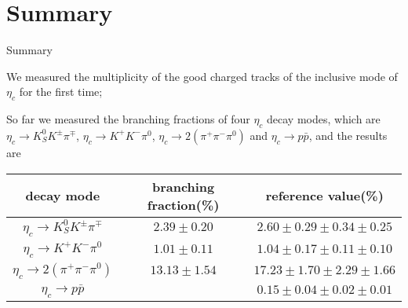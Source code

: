 \documentclass{beamer}
\begin{document}
\section{Summary}
\begin{frame}{Summary}
  \begin{block}{}
    We measured the multiplicity of the good charged tracks of the inclusive mode of $\eta_c$ for the first time;
  \end{block}
  \begin{block}{}
    So far we measured the branching fractions of four $\eta_c$ decay modes, which are $\eta_c\to K_S^0 K^{\pm} \pi^{\mp}$, $\eta_c\to K^+K^-\pi^0$, $\eta_c\to 2(\pi^+\pi^-\pi^0)$ and $\eta_c\to p\bar{p}$, and the results are
    \begin{table}[~hbp]\small
      \begin{tabular}{c|c|c}
        \hline
        \hline
        decay mode & branching fraction(\%) & reference value(\%) \footnotemark[1] \\
        \hline
        $\eta_c\to K_S^0K^{\pm}\pi^{\mp}$ & $2.39\pm0.20$ & $2.60\pm0.29\pm0.34\pm0.25$ \\
        $\eta_c\to K^+ K^- \pi^0$ & $1.01\pm0.11$ & $ 1.04\pm0.17\pm0.11\pm0.10$ \\
        $\eta_c\to2(\pi^+\pi^-\pi^0)$ & $13.13\pm1.54$ & $17.23\pm1.70\pm2.29\pm1.66$ \\
        $\eta_c\to p\bar{p}$ &  & $0.15\pm0.04\pm0.02\pm0.01$ \\
        \hline
        \hline
      \end{tabular}
    \end{table}
  \end{block}
\end{frame}
\end{document}
